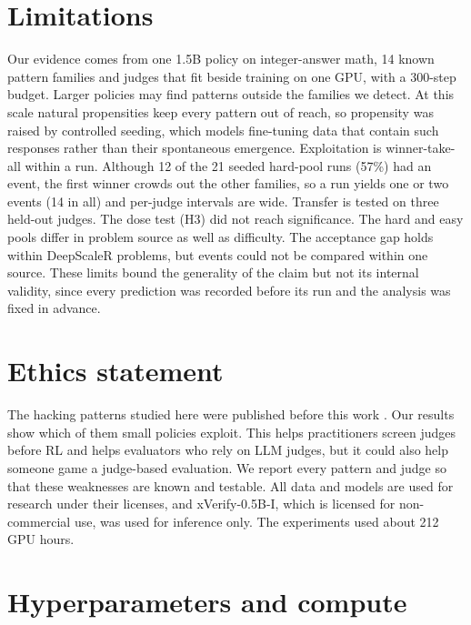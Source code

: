 \documentclass[11pt]{article}
\begin{document}
\section*{Limitations}

Our evidence comes from one 1.5B policy on integer-answer math, 14 known pattern families and judges that fit beside
training on one GPU, with a 300-step budget. Larger policies may find patterns outside the families we detect.
At this scale natural propensities keep every pattern out of reach, so propensity was raised by controlled seeding,
which models fine-tuning data that contain such responses rather than their spontaneous emergence. Exploitation is
winner-take-all within a run. Although 12 of the 21 seeded hard-pool runs (57\%) had an event, the first winner
crowds out the other families, so a run yields one or two events (14 in all) and per-judge intervals are wide.
Transfer is tested on three held-out judges. The dose test (H3) did not reach significance. The hard and easy pools
differ in problem source as well as difficulty. The acceptance gap holds within DeepScaleR problems, but events could
not be compared within one source. These limits bound the generality of the claim but not its internal
validity, since every prediction was recorded before its run and the analysis was fixed in advance.

\section*{Ethics statement}

The hacking patterns studied here were published before this work \citep{huang2025accuracy, zhao2025onetoken}. Our
results show which of them small policies exploit. This helps practitioners screen judges before RL and helps
evaluators who rely on LLM judges, but it could also help someone game a judge-based evaluation. We report every
pattern and judge so that these weaknesses are known and testable. All data and models are used for research under
their licenses, and xVerify-0.5B-I, which is licensed for non-commercial use, was used for inference only. The experiments
used about 212 GPU hours.



\appendix

\section{Hyperparameters and compute}
\label{app:hyper}
\end{document}
